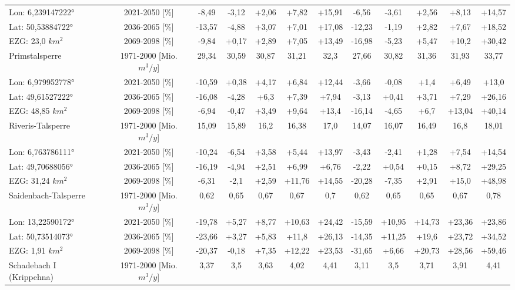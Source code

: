 \begin{longtable}{@{\extracolsep{\fill}}lc|ccccc||ccccc}
\cline{2-12} 
Lon: 6,239147222° & 2021-2050 [\%]  & -8,49 & -3,12 & +2,06 & +7,82 & +15,91 & -6,56 & -3,61 & +2,56 & +8,13 & +14,57\\ 
Lat: 50,53884722° & 2036-2065 [\%]  & -13,57 & -4,88 & +3,07 & +7,01 & +17,08 & -12,23 & -1,19 & +2,82 & +7,67 & +18,52\\ 
EZG: 23,0 $km^2$ & 2069-2098 [\%]  & -9,84 & +0,17 & +2,89 & +7,05 & +13,49 & -16,98 & -5,23 & +5,47 & +10,2 & +30,42\\ 
\hline 
Primstalsperre & 1971-2000 [Mio. $m^3/y$]  & 29,34 & 30,59 & 30,87 & 31,21 & 32,3 & 27,66 & 30,82 & 31,36 & 31,93 & 33,77\\ 
\cline{2-12} 
Lon: 6,979952778° & 2021-2050 [\%]  & -10,59 & +0,38 & +4,17 & +6,84 & +12,44 & -3,66 & -0,08 & +1,4 & +6,49 & +13,0\\ 
Lat: 49,61527222° & 2036-2065 [\%]  & -16,08 & -4,28 & +6,3 & +7,39 & +7,94 & -3,13 & +0,41 & +3,71 & +7,29 & +26,16\\ 
EZG: 48,85 $km^2$ & 2069-2098 [\%]  & -6,94 & -0,47 & +3,49 & +9,64 & +13,4 & -16,14 & -4,65 & +6,7 & +13,04 & +40,14\\ 
\hline 
Riveris-Talsperre & 1971-2000 [Mio. $m^3/y$]  & 15,09 & 15,89 & 16,2 & 16,38 & 17,0 & 14,07 & 16,07 & 16,49 & 16,8 & 18,01\\ 
\cline{2-12} 
Lon: 6,763786111° & 2021-2050 [\%]  & -10,24 & -6,54 & +3,58 & +5,44 & +13,97 & -3,43 & -2,41 & +1,28 & +7,54 & +14,54\\ 
Lat: 49,70688056° & 2036-2065 [\%]  & -16,19 & -4,94 & +2,51 & +6,99 & +6,76 & -2,22 & +0,54 & +0,15 & +8,72 & +29,25\\ 
EZG: 31,24 $km^2$ & 2069-2098 [\%]  & -6,31 & -2,1 & +2,59 & +11,76 & +14,55 & -20,28 & -7,35 & +2,91 & +15,0 & +48,98\\ 
\hline 
Saidenbach-Talsperre & 1971-2000 [Mio. $m^3/y$]  & 0,62 & 0,65 & 0,67 & 0,67 & 0,7 & 0,62 & 0,65 & 0,65 & 0,67 & 0,78\\ 
\cline{2-12} 
Lon: 13,22590172° & 2021-2050 [\%]  & -19,78 & +5,27 & +8,77 & +10,63 & +24,42 & -15,59 & +10,95 & +14,73 & +23,36 & +23,86\\ 
Lat: 50,73514073° & 2036-2065 [\%]  & -23,66 & +3,27 & +5,83 & +11,8 & +26,13 & -14,35 & +11,25 & +19,6 & +23,72 & +34,52\\ 
EZG: 1,91 $km^2$ & 2069-2098 [\%]  & -20,37 & -0,18 & +7,35 & +12,22 & +23,53 & -31,65 & +6,66 & +20,73 & +28,56 & +59,46\\ 
\hline 
Schadebach I (Krippehna) & 1971-2000 [Mio. $m^3/y$]  & 3,37 & 3,5 & 3,63 & 4,02 & 4,41 & 3,11 & 3,5 & 3,71 & 3,91 & 4,41\\ 

\end{longtable}
